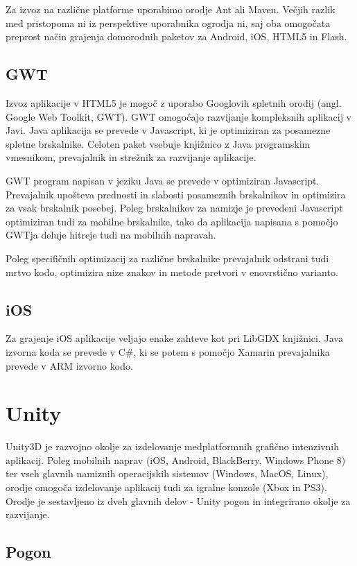 Za izvoz na različne platforme uporabimo orodje Ant ali Maven. Večjih razlik med pristopoma ni iz perspektive uporabnika ogrodja ni, saj oba omogočata preprost način grajenja domorodnih paketov za Android, iOS, HTML5 in Flash.

\subsection{GWT}

Izvoz aplikacije v HTML5 je mogoč z uporabo Googlovih spletnih orodij (angl. Google Web Toolkit, GWT). GWT omogočajo razvijanje kompleksnih aplikacij v Javi. Java aplikacija se prevede v Javascript, ki je optimiziran za posamezne spletne brskalnike. Celoten paket vsebuje knjižnico z Java programskim vmesnikom, prevajalnik in strežnik za razvijanje aplikacije.

GWT program napisan v jeziku Java se prevede v optimiziran Javascript. Prevajalnik upošteva prednosti in slabosti posameznih brskalnikov in optimizira za vsak brskalnik posebej. Poleg brskalnikov za namizje je prevedeni Javascript optimiziran tudi za mobilne brskalnike, tako da aplikacija napisana s pomočjo GWTja deluje hitreje tudi na mobilnih napravah.

Poleg specifičnih optimizacij za različne brskalnike prevajalnik odstrani tudi mrtvo kodo, optimizira nize znakov in metode pretvori v enovrstično varianto.

\subsection{iOS}

Za grajenje iOS aplikacije veljajo enake zahteve kot pri LibGDX knjižnici. Java izvorna koda se prevede v C\#, ki se potem s pomočjo Xamarin prevajalnika prevede v ARM izvorno kodo. 

\section{Unity}

Unity3D \cite{unity} je razvojno okolje za izdelovanje medplatformnih grafično intenzivnih aplikacij. Poleg mobilnih naprav (iOS, Android, BlackBerry, Windows Phone 8) ter vseh glavnih namiznih operacijskih sistemov (Windows, MacOS, Linux), orodje omogoča izdelovanje aplikacij tudi za igralne konzole (Xbox in PS3). Orodje je sestavljeno iz dveh glavnih delov - Unity pogon in integrirano okolje za razvijanje.

\subsection{Pogon}

